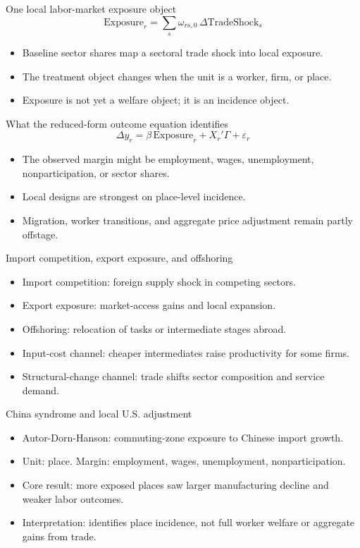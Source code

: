 \documentclass[aspectratio=169,11pt]{beamer}
\begin{document}
\begin{frame}{One local labor-market exposure object}
\[
\text{Exposure}_r = \sum_s \omega_{rs,0}\,\Delta \text{TradeShock}_s
\]

\begin{itemize}
    \item Baseline sector shares map a sectoral trade shock into local exposure.
    \item The treatment object changes when the unit is a worker, firm, or place.
    \item Exposure is not yet a welfare object; it is an incidence object.
\end{itemize}
\end{frame}

\begin{frame}{What the reduced-form outcome equation identifies}
\[
\Delta y_r = \beta \,\text{Exposure}_r + X_r'\Gamma + \varepsilon_r
\]

\begin{itemize}
    \item The observed margin might be employment, wages, unemployment, nonparticipation, or sector shares.
    \item Local designs are strongest on place-level incidence.
    \item Migration, worker transitions, and aggregate price adjustment remain partly offstage.
\end{itemize}
\end{frame}

\begin{frame}{Import competition, export exposure, and offshoring}
\begin{itemize}
    \item Import competition: foreign supply shock in competing sectors.
    \item Export exposure: market-access gains and local expansion.
    \item Offshoring: relocation of tasks or intermediate stages abroad.
    \item Input-cost channel: cheaper intermediates raise productivity for some firms.
    \item Structural-change channel: trade shifts sector composition and service demand.
\end{itemize}
\end{frame}

\begin{frame}{China syndrome and local U.S. adjustment}
\begin{itemize}
    \item Autor-Dorn-Hanson: commuting-zone exposure to Chinese import growth.
    \item Unit: place. Margin: employment, wages, unemployment, nonparticipation.
    \item Core result: more exposed places saw larger manufacturing decline and weaker labor outcomes.
    \item Interpretation: identifies place incidence, not full worker welfare or aggregate gains from trade.
\end{itemize}
\end{frame}
\end{document}
